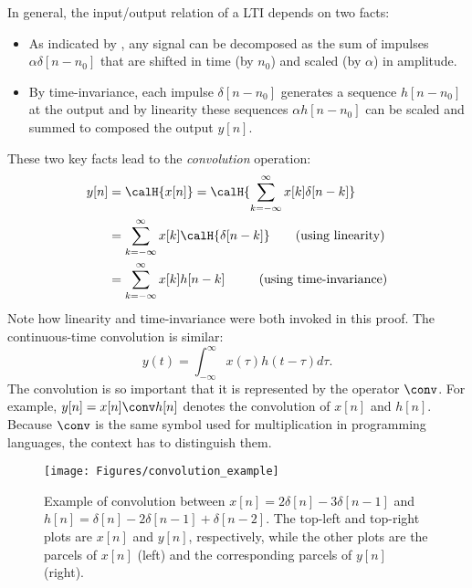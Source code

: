 In general, the input/output relation of a LTI depends on two facts:
\begin{itemize}
	\item As indicated by , any signal can be decomposed as the sum of impulses $\alpha \delta[n-n_0]$ that are shifted in time (by $n_0$) and scaled (by $\alpha$) in amplitude.
	\item By time-invariance, each impulse $\delta[n-n_0]$ generates a sequence $h[n-n_0]$ at the output and by linearity these sequences $\alpha h[n-n_0]$ can be scaled and summed to composed the output $y[n]$.
\end{itemize}
These two key facts lead to the \emph{convolution} operation:
\begin{align}
y[n] & = \calH\{x[n]\} = \calH\{\sum_{k=-\infty}^{\infty} x[k] \delta[n-k]\} \nonumber \\
& = \sum_{k=-\infty}^{\infty} x[k] \calH\{\delta[n-k]\}\tag*{\text{(using linearity)}} \nonumber \\
& = \sum_{k=-\infty}^{\infty} x[k] h[n-k]\textrm{~~~~~~~~(using time-invariance)} \label{eq:convolution}
\end{align}
Note how linearity and time-invariance were both invoked in this proof. The continuous-time convolution is similar:
\begin{equation}
y(t) =  \int_{-\infty}^{\infty} x(\tau) h(t-\tau) d\tau.
\label{eq:convolution_in_continuoustime}
\end{equation}
The convolution is so important that it is represented by the operator $\conv$. For example, $y[n]=x[n] \conv h[n]$ denotes the convolution of $x[n]$ and $h[n]$. Because $\conv$ is the same symbol used for multiplication in programming languages, the context has to distinguish them.

\begin{figure}
\centering
\texttt{[image: Figures/convolution\_example]}
\caption[{Example of convolution between $x[n]=2\delta[n]-3\delta[n-1]$ and $h[n]=\delta[n]-2\delta[n-1]+\delta[n-2]$.}]{Example of convolution between $x[n]=2\delta[n]-3\delta[n-1]$ and $h[n]=\delta[n]-2\delta[n-1]+\delta[n-2]$. The top-left and top-right plots are $x[n]$ and $y[n]$, respectively, while the other plots are the parcels of $x[n]$ (left) and the corresponding parcels of $y[n]$ (right).\label{fig:convolution_example}}
\end{figure}


